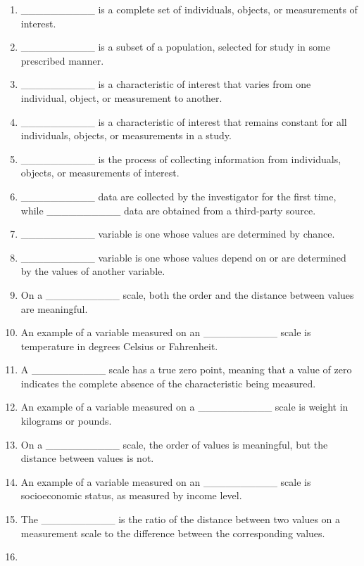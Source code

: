\documentclass[
]{book}
\begin{document}
\begin{enumerate}
\def\labelenumi{\arabic{enumi}.}
\item
  \_\_\_\_\_\_\_\_\_\_ is a complete set of individuals, objects, or
  measurements of interest.
\item
  \_\_\_\_\_\_\_\_\_\_ is a subset of a population, selected for study
  in some prescribed manner.
\item
  \_\_\_\_\_\_\_\_\_\_ is a characteristic of interest that varies
  from one individual, object, or measurement to another.
\item
  \_\_\_\_\_\_\_\_\_\_ is a characteristic of interest that remains
  constant for all individuals, objects, or measurements in a study.
\item
  \_\_\_\_\_\_\_\_\_\_ is the process of collecting information from
  individuals, objects, or measurements of interest.
\item
  \_\_\_\_\_\_\_\_\_\_ data are collected by the investigator for the
  first time, while \_\_\_\_\_\_\_\_\_\_ data are obtained from a
  third-party source.
\item
  \_\_\_\_\_\_\_\_\_\_ variable is one whose values are determined by
  chance.
\item
  \_\_\_\_\_\_\_\_\_\_ variable is one whose values depend on or are
  determined by the values of another variable.
\item
  On a \_\_\_\_\_\_\_\_\_\_ scale, both the order and the distance
  between values are meaningful.
\item
  An example of a variable measured on an \_\_\_\_\_\_\_\_\_\_ scale
  is temperature in degrees Celsius or Fahrenheit.
\item
  A \_\_\_\_\_\_\_\_\_\_ scale has a true zero point, meaning that a
  value of zero indicates the complete absence of the characteristic
  being measured.
\item
  An example of a variable measured on a \_\_\_\_\_\_\_\_\_\_ scale is
  weight in kilograms or pounds.
\item
  On a \_\_\_\_\_\_\_\_\_\_ scale, the order of values is meaningful,
  but the distance between values is not.
\item
  An example of a variable measured on an \_\_\_\_\_\_\_\_\_\_ scale
  is socioeconomic status, as measured by income level.
\item
  The \_\_\_\_\_\_\_\_\_\_ is the ratio of the distance between two
  values on a measurement scale to the difference between the
  corresponding values.
\item

\end{enumerate}
\end{document}
